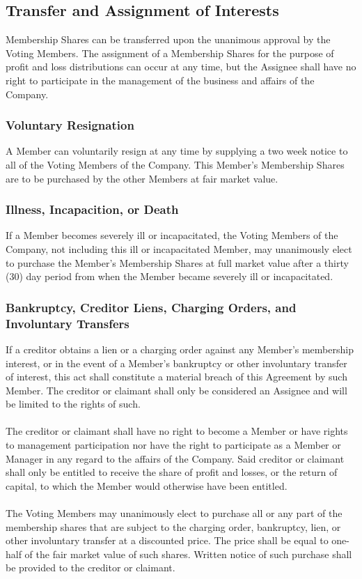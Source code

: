 \documentclass[11pt]{article}
\begin{document}
\subsection{Transfer and Assignment of Interests}
Membership Shares can be transferred upon the unanimous approval by the Voting Members. The assignment of a Membership Shares for the purpose of profit and loss distributions can occur at any time, but the Assignee shall have no right to participate in the management of the business and affairs of the Company.

\subsubsection{Voluntary Resignation}
A Member can voluntarily resign at any time by supplying a two week notice to all of the Voting Members of the Company. This Member’s Membership Shares are to be purchased by the other Members at fair market value.

\subsubsection{Illness, Incapacition, or Death}
If a Member becomes severely ill or incapacitated, the Voting Members of the Company, not including this ill or incapacitated Member, may unanimously elect to purchase the Member's Membership Shares at full market value after a thirty (30) day period from when the Member became severely ill or incapacitated.

\subsubsection{Bankruptcy, Creditor Liens, Charging Orders, and Involuntary Transfers}
If a creditor obtains a lien or a charging order against any Member's membership interest, or in the event of a Member's bankruptcy or other involuntary transfer of interest, this act shall constitute a material breach of this Agreement by such Member. The creditor or claimant shall only be considered an Assignee and will be limited to the rights of such.\\\\
The creditor or claimant shall have no right to become a Member or have rights to management participation nor have the right to participate as a Member or Manager in any regard to the affairs of the Company. Said creditor or claimant shall only be entitled to receive the share of profit and losses, or the return of capital, to which the Member would otherwise have been entitled.\\\\
The Voting Members may unanimously elect to purchase all or any part of the membership shares that are subject to the charging order, bankruptcy, lien, or other involuntary transfer at a discounted price. The price shall be equal to one-half of the fair market value of such shares. Written notice of such purchase shall be provided to the creditor or claimant.
\end{document}
